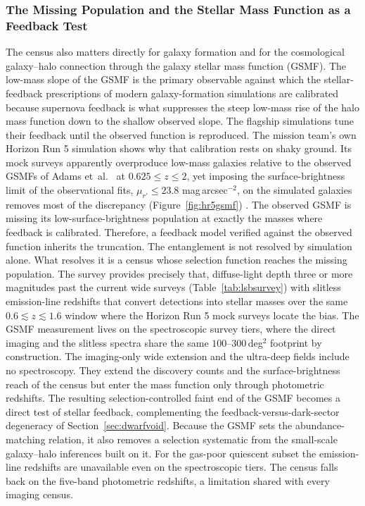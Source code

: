 \subsubsection{The Missing Population and the Stellar Mass Function as a Feedback Test}

The census also matters directly for galaxy formation and for the cosmological galaxy--halo connection through the galaxy stellar mass function (GSMF). The low-mass slope of the GSMF is the primary observable against which the stellar-feedback prescriptions of modern galaxy-formation simulations are calibrated because supernova feedback is what suppresses the steep low-mass rise of the halo mass function down to the shallow observed slope. The flagship simulations tune their feedback until the observed function is reproduced. The mission team's own Horizon Run 5 simulation shows why that calibration rests on shaky ground. Its mock surveys apparently overproduce low-mass galaxies relative to the observed GSMFs of Adams et~al.\ \cite{adams2021} at $0.625\le z\le2$, yet imposing the surface-brightness limit of the observational fits, $\mu_{r'}\leq23.8$ mag\,arcsec$^{-2}$, on the simulated galaxies removes most of the discrepancy (Figure~\ref{fig:hr5gsmf}) \cite{kim2023gsmf}. The observed GSMF is missing its low-surface-brightness population at exactly the masses where feedback is calibrated. Therefore, a feedback model verified against the observed function inherits the truncation. The entanglement is not resolved by simulation alone. What resolves it is a census whose selection function reaches the missing population. The survey provides precisely that, diffuse-light depth three or more magnitudes past the current wide surveys (Table~\ref{tab:lsbsurvey}) with slitless emission-line redshifts that convert detections into stellar masses over the same $0.6\lesssim z\lesssim1.6$ window where the Horizon Run 5 mock surveys locate the bias. The GSMF measurement lives on the spectroscopic survey tiers, where the direct imaging and the slitless spectra share the same $100$--$300$\,deg$^2$ footprint by construction. The imaging-only wide extension and the ultra-deep fields include no spectroscopy. They extend the discovery counts and the surface-brightness reach of the census but enter the mass function only through photometric redshifts. The resulting selection-controlled faint end of the GSMF becomes a direct test of stellar feedback, complementing the feedback-versus-dark-sector degeneracy of Section~\ref{sec:dwarfvoid}. Because the GSMF sets the abundance-matching relation, it also removes a selection systematic from the small-scale galaxy--halo inferences built on it. For the gas-poor quiescent subset the emission-line redshifts are unavailable even on the spectroscopic tiers. The census falls back on the five-band photometric redshifts, a limitation shared with every imaging census.

